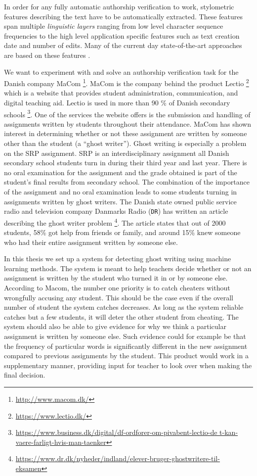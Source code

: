 In order for any fully automatic authorship verification to work, stylometric
features describing the text have to be automatically extracted. These features
span multiple \textit{linguistic layers} ranging from low level character
sequence frequencies to the high level application specific features such as
text creation date and number of edits. Many of the current day state-of-the-art
approaches are based on these features \citep{stamatos2009}.


We want to experiment with and solve an authorship verification task for the
Danish company MaCom \footnote{\url{http://www.macom.dk/}}. MaCom is the company
behind the product Lectio \footnote{\url{https://www.lectio.dk/}} which is
a website that provides student administration, communication, and digital
teaching aid. Lectio is used in more than 90 \% of Danish secondary schools
\footnote{\url{https://www.business.dk/digital/df-ordforer-om-pivabent-lectio-de
t-kan-vaere-farligt-hvis-man-taenker}}. One of the services the website
offers is the submission and handling of assignments written by students
throughout their attendance. MaCom has shown interest in determining
whether or not these assignment are written by someone other than the
student (a ``ghost writer''). Ghost writing is especially a problem on
the \gls{SRP} assignment. \gls{SRP} is an interdisciplinary assignment
all Danish secondary school students turn in during their third year and
last year. There is no oral examination for the assignment and the grade
obtained is part of the student's final results from secondary school. The
combination of the importance of the assignment and no oral examination
leads to some students turning in assignments written by ghost writers. The
Danish state owned public service radio and television company Danmarks Radio
(\texttt{DR}) has written an article describing the ghost writer problem
\footnote{\url{https://www.dr.dk/nyheder/indland/elever-bruger-ghostwritere-til-
eksamen}}. The article states that out of 2000 students, 58\% got help from
friends or family, and around 15\% knew someone who had their entire assignment
written by someone else. 

In this thesis we set up a system for detecting ghost writing using machine
learning methods. The system is meant to help teachers decide whether or not
an assignment is written by the student who turned it in or by someone else.
According to Macom, the number one priority is to catch cheaters without
wrongfully accusing any student. This should be the case even if the overall
number of student the system catches decreases. As long as the system reliable
catches but a few students, it will deter the other student from cheating.
The system should also be able to give evidence for why we think a particular
assignment is written by someone else. Such evidence could for example be
that the frequency of particular words is significantly different in the new
assignment compared to previous assignments by the student. This product would
work in a supplementary manner, providing input for teacher to look over when
making the final decision.

